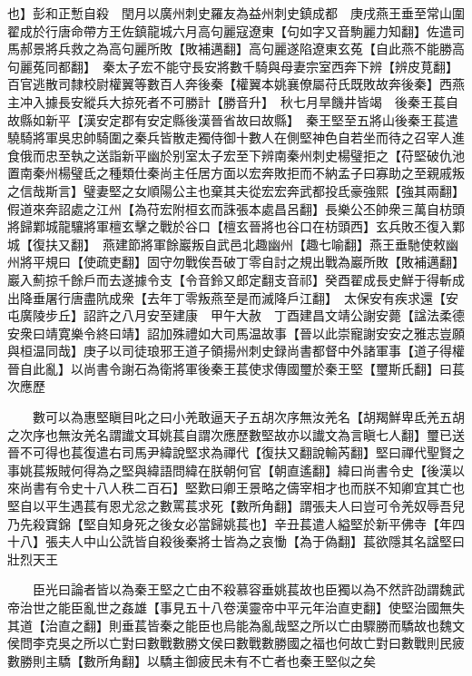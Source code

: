 也】彭和正慙自殺　閏月以廣州刺史羅友為益州刺史鎮成都　庚戌燕王垂至常山圍翟成於行唐命帶方王佐鎮龍城六月高句麗寇遼東【句如字又音駒麗力知翻】佐遣司馬郝景將兵救之為高句麗所敗【敗補邁翻】高句麗遂陷遼東玄菟【自此燕不能勝高句麗菟同都翻】　秦太子宏不能守長安將數千騎與母妻宗室西奔下辨【辨皮莧翻】百官逃散司隸校尉權翼等數百人奔後秦【權翼本姚襄僚屬苻氏既敗故奔後秦】西燕主冲入據長安縱兵大掠死者不可勝計【勝音升】　秋七月旱饑井皆竭　後秦王萇自故縣如新平【漢安定郡有安定縣後漢晉省故曰故縣】　秦王堅至五將山後秦王萇遣驍騎將軍吳忠帥騎圍之秦兵皆散走獨侍御十數人在側堅神色自若坐而待之召宰人進食俄而忠至執之送詣新平幽於别室太子宏至下辨南秦州刺史楊璧拒之【苻堅破仇池置南秦州楊璧氐之種類仕秦尚主任居方面以宏奔敗拒而不納孟子曰寡助之至親戚叛之信哉斯言】璧妻堅之女順陽公主也棄其夫從宏宏奔武都投氐豪強熙【強其兩翻】假道來奔詔處之江州【為苻宏附桓玄而誅張本處昌呂翻】長樂公丕帥衆三萬自枋頭將歸鄴城龍驤將軍檀玄擊之戰於谷口【檀玄晉將也谷口在枋頭西】玄兵敗丕復入鄴城【復扶又翻】　燕建節將軍餘巖叛自武邑北趣幽州【趣七喻翻】燕王垂馳使敕幽州將平規曰【使疏吏翻】固守勿戰俟吾破丁零自討之規出戰為巖所敗【敗補邁翻】巖入薊掠千餘戶而去遂據令支【令音鈴又郎定翻支音祁】癸酉翟成長史鮮于得斬成出降垂屠行唐盡阬成衆【去年丁零叛燕至是而滅降戶江翻】　太保安有疾求還【安屯廣陵步丘】詔許之八月安至建康　甲午大赦　丁酉建昌文靖公謝安薨【諡法柔德安衆曰靖寛樂令終曰靖】詔加殊禮如大司馬温故事【晉以此崇寵謝安安之雅志豈願與桓温同哉】庚子以司徒琅邪王道子領揚州刺史録尚書都督中外諸軍事【道子得權晉自此亂】以尚書令謝石為衛將軍後秦王萇使求傳國璽於秦王堅【璽斯氏翻】曰萇次應歷

　　數可以為惠堅瞋目叱之曰小羌敢逼天子五胡次序無汝羌名【胡羯鮮卑氐羌五胡之次序也無汝羌名謂䜟文耳姚萇自謂次應歷數堅故亦以䜟文為言瞋七人翻】璽已送晉不可得也萇復遣右司馬尹緯說堅求為禪代【復扶又翻說輸芮翻】堅曰禪代聖賢之事姚萇叛賊何得為之堅與緯語問緯在朕朝何官【朝直遙翻】緯曰尚書令史【後漢以來尚書有令史十八人秩二百石】堅歎曰卿王景略之儔宰相才也而朕不知卿宜其亡也堅自以平生遇萇有恩尤忿之數罵萇求死【數所角翻】謂張夫人曰豈可令羌奴辱吾兒乃先殺寶錦【堅自知身死之後女必當歸姚萇也】辛丑萇遣人縊堅於新平佛寺【年四十八】張夫人中山公詵皆自殺後秦將士皆為之哀慟【為于偽翻】萇欲隱其名諡堅曰壯烈天王

　　臣光曰論者皆以為秦王堅之亡由不殺慕容垂姚萇故也臣獨以為不然許劭謂魏武帝治世之能臣亂世之姦雄【事見五十八卷漢靈帝中平元年治直吏翻】使堅治國無失其道【治直之翻】則垂萇皆秦之能臣也烏能為亂哉堅之所以亡由驟勝而驕故也魏文侯問李克吳之所以亡對曰數戰數勝文侯曰數戰數勝國之福也何故亡對曰數戰則民疲數勝則主驕【數所角翻】以驕主御疲民未有不亡者也秦王堅似之矣

